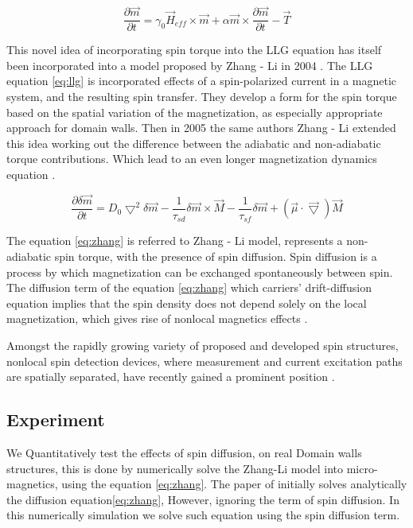 \begin{equation}  \label{eq:llg}
	\frac{\partial \vec{m}}{\partial t} = \gamma_0\vec{H}_{eff} \times \vec{m} + \alpha \vec{m} \times \frac{\partial \vec{m}}{\partial t} - \vec{T}
\end{equation}

This novel idea of incorporating spin torque into the LLG equation has itself been incorporated into a model proposed by Zhang - Li in 2004 \cite{zhang2004}. The LLG equation \ref{eq:llg} is incorporated effects of a spin-polarized current in a magnetic system, and the resulting spin transfer. They develop a form for the spin torque based on the spatial variation of the magnetization, as especially appropriate approach for domain walls. Then in 2005 the same authors Zhang - Li extended this idea working out the difference between the adiabatic and non-adiabatic torque contributions. Which lead to an even longer magnetization dynamics equation \cite{zhang} \cite{spindomain}.

\begin{equation} \label{eq:zhang}
 \frac{\partial \delta \vec{m} }{\partial t} =  D_{0}\bigtriangledown^{2} \delta \vec{m} - \frac{1}{\tau_{sd}} \delta \vec{m} \times \vec{M} - \frac{1}{\tau_{sf}}\delta \vec{m} +(\vec{\mu} \cdot\vec{\bigtriangledown} )\vec{M}
\end{equation}

The equation \ref{eq:zhang} is referred to Zhang - Li model, represents a non-adiabatic spin torque, with the presence of spin diffusion. Spin diffusion is a process by which magnetization can be exchanged spontaneously between spin. The diffusion term of the equation \ref{eq:zhang} which carriers’  drift-diffusion equation implies that the spin density does not depend solely on the local magnetization, which gives rise of nonlocal magnetics effects \cite{claudio}.

Amongst the rapidly growing variety of proposed and developed spin structures, nonlocal spin detection devices, where measurement and current excitation paths are spatially separated, have recently gained a prominent position \cite{spinz}.

\subsection{Experiment}

We Quantitatively test the effects of spin diffusion, on real Domain walls structures, this is done by numerically solve the Zhang-Li model into micro-magnetics, using the equation \ref{eq:zhang}. The paper of \cite{zhang} initially solves analytically the diffusion equation\ref{eq:zhang}, However, ignoring the term of spin diffusion. In this numerically simulation we solve such equation using the spin diffusion term.


